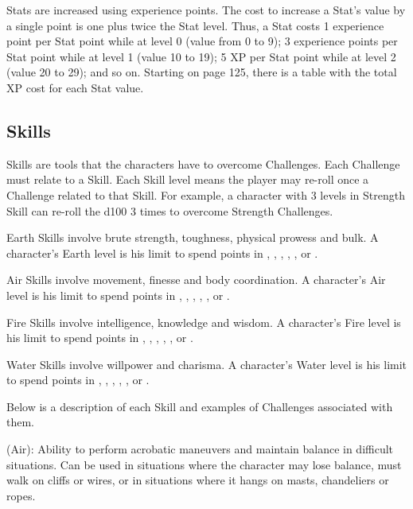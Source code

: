 \begin{multicols}{2}
Stats are increased using experience points. The cost to increase a Stat's value by a single point is one plus twice the Stat level. Thus, a Stat costs 1 experience point per Stat point while at level 0 (value from 0 to 9); 3 experience points per Stat point while at level 1 (value 10 to 19); 5 XP per Stat point while at level 2 (value 20 to 29); and so on. Starting on page 125, there is a table with the total XP cost for each Stat value. \pc
{\centering %
}%

\subsection{Skills}\label{subsec:skills}
\begin{ffcolpage}
Skills are tools that the characters have to overcome Challenges. Each Challenge must relate to a Skill. Each Skill level means the player may re-roll once a Challenge related to that Skill. For example, a character with 3 levels in Strength Skill can re-roll the d100 3 times to overcome Strength Challenges. \pc

Earth Skills involve brute strength, toughness, physical prowess and bulk. A character's Earth level is his limit to spend points in , , , , , or . \pc

Air Skills involve movement, finesse and body coordination. A character's Air level is his limit to spend points in , , , , , or . \pc

Fire Skills involve intelligence, knowledge and wisdom. A character's Fire level is his limit to spend points in , , , , , or . \pc

Water Skills involve willpower and charisma. A character's Water level is his limit to spend points in , , , , , or .
\end{ffcolpage} \pc
Below is a description of each Skill and examples of Challenges associated with them. \pw

\begin{ffcolpage}
 (Air): Ability to perform acrobatic maneuvers and maintain balance in difficult situations. Can be used in situations where the character may lose balance, must walk on cliffs or wires, or in situations where it hangs on masts, chandeliers or ropes.
\end{ffcolpage} \pw


\end{multicols}
